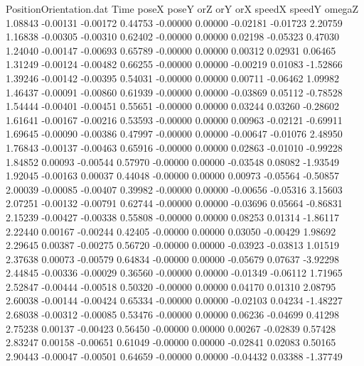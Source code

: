 \begin{filecontents}{PositionOrientation.dat}
Time poseX poseY orZ orY orX speedX speedY omegaZ
   1.08843   -0.00131   -0.00172     0.44753   -0.00000    0.00000   -0.02181   -0.01723    2.20759
   1.16838   -0.00305   -0.00310     0.62402   -0.00000    0.00000    0.02198   -0.05323    0.47030
   1.24040   -0.00147   -0.00693     0.65789   -0.00000    0.00000    0.00312    0.02931    0.06465
   1.31249   -0.00124   -0.00482     0.66255   -0.00000    0.00000   -0.00219    0.01083   -1.52866
   1.39246   -0.00142   -0.00395     0.54031   -0.00000    0.00000    0.00711   -0.06462    1.09982
   1.46437   -0.00091   -0.00860     0.61939   -0.00000    0.00000   -0.03869    0.05112   -0.78528
   1.54444   -0.00401   -0.00451     0.55651   -0.00000    0.00000    0.03244    0.03260   -0.28602
   1.61641   -0.00167   -0.00216     0.53593   -0.00000    0.00000    0.00963   -0.02121   -0.69911
   1.69645   -0.00090   -0.00386     0.47997   -0.00000    0.00000   -0.00647   -0.01076    2.48950
   1.76843   -0.00137   -0.00463     0.65916   -0.00000    0.00000    0.02863   -0.01010   -0.99228
   1.84852    0.00093   -0.00544     0.57970   -0.00000    0.00000   -0.03548    0.08082   -1.93549
   1.92045   -0.00163    0.00037     0.44048   -0.00000    0.00000    0.00973   -0.05564   -0.50857
   2.00039   -0.00085   -0.00407     0.39982   -0.00000    0.00000   -0.00656   -0.05316    3.15603
   2.07251   -0.00132   -0.00791     0.62744   -0.00000    0.00000   -0.03696    0.05664   -0.86831
   2.15239   -0.00427   -0.00338     0.55808   -0.00000    0.00000    0.08253    0.01314   -1.86117
   2.22440    0.00167   -0.00244     0.42405   -0.00000    0.00000    0.03050   -0.00429    1.98692
   2.29645    0.00387   -0.00275     0.56720   -0.00000    0.00000   -0.03923   -0.03813    1.01519
   2.37638    0.00073   -0.00579     0.64834   -0.00000    0.00000   -0.05679    0.07637   -3.92298
   2.44845   -0.00336   -0.00029     0.36560   -0.00000    0.00000   -0.01349   -0.06112    1.71965
   2.52847   -0.00444   -0.00518     0.50320   -0.00000    0.00000    0.04170    0.01310    2.08795
   2.60038   -0.00144   -0.00424     0.65334   -0.00000    0.00000   -0.02103    0.04234   -1.48227
   2.68038   -0.00312   -0.00085     0.53476   -0.00000    0.00000    0.06236   -0.04699    0.41298
   2.75238    0.00137   -0.00423     0.56450   -0.00000    0.00000    0.00267   -0.02839    0.57428
   2.83247    0.00158   -0.00651     0.61049   -0.00000    0.00000   -0.02841    0.02083    0.50165
   2.90443   -0.00047   -0.00501     0.64659   -0.00000    0.00000   -0.04432    0.03388   -1.37749

\end{filecontents}
